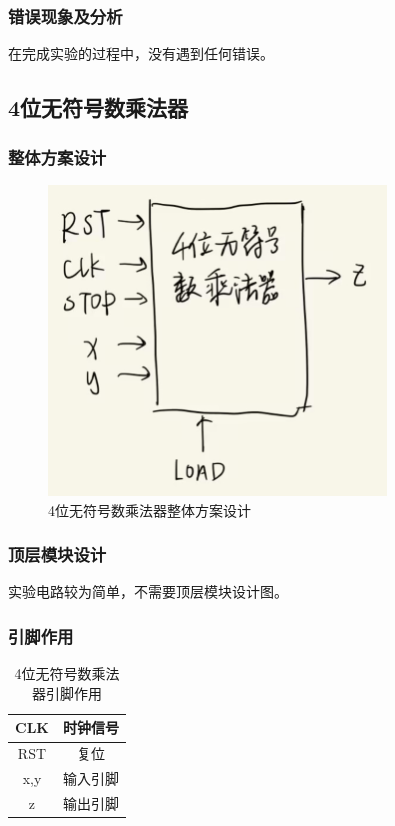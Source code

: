 \documentclass{article}
\begin{document}
    \subsubsection{错误现象及分析}
    在完成实验的过程中，没有遇到任何错误。

    \subsection{4位无符号数乘法器}
    \subsubsection{整体方案设计}
    \begin{figure}[H]
    \centering
    \includegraphics[width=0.8\textwidth]{4.1.png}
    \caption{4位无符号数乘法器整体方案设计}
    \end{figure}

    \subsubsection{顶层模块设计}
    实验电路较为简单，不需要顶层模块设计图。

    \subsubsection{引脚作用}
    \begin{table}[H]
    \centering
    \begin{tabular}{|c|c|}
        \hline
        CLK & 时钟信号 \\ \hline
        RST & 复位 \\ \hline
        x,y & 输入引脚 \\ \hline
        z & 输出引脚 \\ \hline
    \end{tabular}
    \caption{4位无符号数乘法器引脚作用}
    \end{table}
\end{document}
